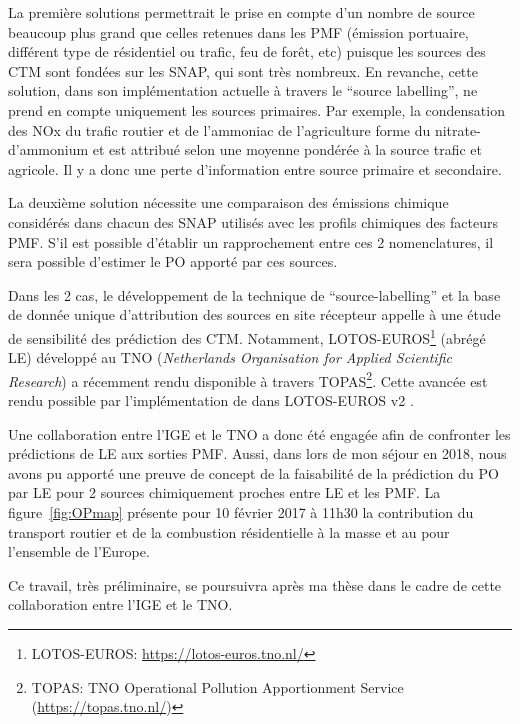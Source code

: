 La première solutions permettrait le prise en compte d'un nombre de source beaucoup plus
grand que celles retenues dans les PMF (émission portuaire, différent type de résidentiel
ou trafic, feu de forêt, etc) puisque les sources des CTM sont fondées sur les SNAP, qui
sont très nombreux.
En revanche, cette solution, dans son implémentation actuelle à travers le ``source
labelling'', ne prend en compte uniquement les sources primaires. Par exemple, la
condensation des NOx du trafic routier et de l'ammoniac de l'agriculture forme du
nitrate-d'ammonium et est attribué selon une moyenne pondérée à la source trafic et
agricole. Il y a donc une perte d'information entre source primaire et secondaire.

La deuxième solution nécessite une comparaison des émissions chimique considérés dans
chacun des SNAP utilisés avec les profils chimiques des facteurs PMF. S'il est possible
d'établir un rapprochement entre ces 2 nomenclatures, il sera possible d'estimer le PO
apporté par ces sources.

Dans les 2 cas, le développement de la technique de ``source-labelling'' et la base de
donnée unique d'attribution des sources en site récepteur appelle à une étude de
sensibilité des prédiction des CTM. Notamment, LOTOS-EUROS\footnote{LOTOS-EUROS:
    \url{https://lotos-euros.tno.nl/}} (abrégé LE) développé au TNO (\textit{Netherlands Organisation for
Applied Scientific Research}) a récemment rendu disponible à travers TOPAS\footnote{TOPAS:
TNO Operational Pollution Apportionment Service (\url{https://topas.tno.nl/})}. Cette
avancée est rendu possible par l'implémentation de \cite{kranenburgSource2013} dans
LOTOS-EUROS v2 \autocite{mandersCurriculum2017}.

Une collaboration entre l'IGE et le TNO a donc été engagée afin de confronter les
prédictions de LE aux sorties PMF. Aussi, dans lors de mon séjour en 2018, nous
avons pu apporté une preuve de concept de la faisabilité de la prédiction du PO par
LE pour 2 sources chimiquement proches entre LE et les PMF.
La figure~\ref{fig:OPmap} présente pour 10 février 2017 à 11h30 la contribution du
transport routier et de la combustion résidentielle à la masse et au \PODTTv{} pour
l'ensemble de l'Europe.

Ce travail, très préliminaire, se poursuivra après ma thèse dans le cadre de cette
collaboration entre l'IGE et le TNO.

